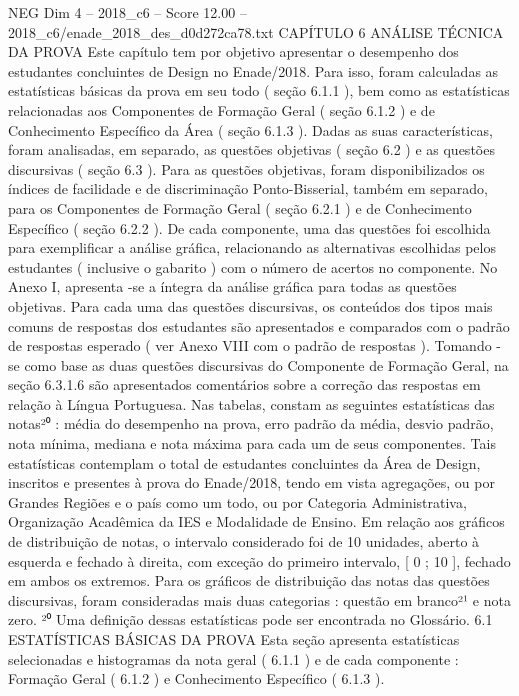 \begin{textsample}{NEG Dim 4 – 2018\_c6 – Score 12.00 – 2018\_c6/enade\_2018\_des\_d0d272ca78.txt}  \label{ex:f4_neg_344}
CAPÍTULO 6 ANÁLISE TÉCNICA DA PROVA Este capítulo tem por objetivo apresentar o desempenho dos estudantes concluintes de Design no Enade/2018.
Para isso, foram calculadas as estatísticas básicas da prova em seu todo ( seção 6.1.1 ), bem como as estatísticas relacionadas aos Componentes de Formação Geral ( seção 6.1.2 ) e de Conhecimento Específico da Área ( seção 6.1.3 ).
Dadas as suas características, foram analisadas, em separado, as questões objetivas ( seção 6.2 ) e as questões discursivas ( seção 6.3 ).
Para as questões objetivas, foram disponibilizados os índices de facilidade e de discriminação Ponto-Bisserial, também em separado, para os Componentes de Formação Geral ( seção 6.2.1 ) e de Conhecimento Específico ( seção 6.2.2 ).
De cada componente, uma das questões foi escolhida para exemplificar a análise gráfica, relacionando as alternativas escolhidas pelos estudantes ( inclusive o gabarito ) com o número de acertos no componente.
No Anexo I, apresenta -se a íntegra da análise gráfica para todas as questões objetivas.
Para cada uma das questões discursivas, os conteúdos dos tipos mais comuns de respostas dos estudantes são apresentados e comparados com o padrão de respostas esperado ( ver Anexo VIII com o padrão de respostas ).
Tomando -se como base as duas questões discursivas do Componente de Formação Geral, na seção 6.3.1.6 são apresentados comentários sobre a correção das respostas em relação à Língua Portuguesa.
Nas tabelas, constam as seguintes estatísticas das notas²⁰ : média do desempenho na prova, erro padrão da média, desvio padrão, nota mínima, mediana e nota máxima para cada um de seus componentes.
Tais estatísticas contemplam o total de estudantes concluintes da Área de Design, inscritos e presentes à prova do Enade/2018, tendo em vista agregações, ou por Grandes Regiões e o país como um todo, ou por Categoria Administrativa, Organização Acadêmica da IES e Modalidade de Ensino.
Em relação aos gráficos de distribuição de notas, o intervalo considerado foi de 10 unidades, aberto à esquerda e fechado à direita, com exceção do primeiro intervalo, [ 0 ; 10 ], fechado em ambos os extremos.
Para os gráficos de distribuição das notas das questões discursivas, foram consideradas mais duas categorias : questão em branco²¹ e nota zero. ²⁰ Uma definição dessas estatísticas pode ser encontrada no Glossário. 6.1 ESTATÍSTICAS BÁSICAS DA PROVA Esta seção apresenta estatísticas selecionadas e histogramas da nota geral ( 6.1.1 ) e de cada componente : Formação Geral ( 6.1.2 ) e Conhecimento Específico ( 6.1.3 ).

\end{textsample}
